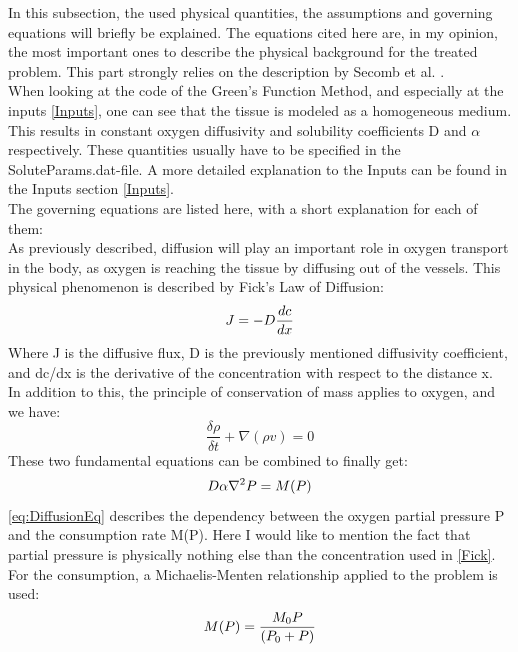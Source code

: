 In this subsection, the used physical quantities, the assumptions and governing equations will briefly be explained. The equations cited here are, in my opinion, the most important ones to describe the physical background for the treated problem. This part strongly relies on the description by Secomb et al. \cite{Secomb2004}.
\\When looking at the code of the Green's Function Method, and especially at the inputs \ref{Inputs}, one can see that the tissue is modeled as a homogeneous medium. This results in constant oxygen diffusivity and solubility coefficients D and $\alpha$ respectively. These quantities usually have to be specified in the SoluteParams.dat-file. A more detailed explanation to the Inputs can be found in the Inputs section \ref{Inputs}.
\\The governing equations are listed here, with a short explanation for each of them:
\\As previously described, diffusion will play an important role in oxygen transport in the body, as oxygen is reaching the tissue by diffusing out of the vessels. This physical phenomenon is described by Fick's Law of Diffusion:
\begin{equation}
\\J = - D \frac{dc}{dx}
\label{Fick}
\end{equation}
%
Where J is the diffusive flux, D is the previously mentioned diffusivity coefficient, and dc/dx is the derivative of the concentration with respect to the distance x.
\\In addition to this, the principle of conservation of mass applies to oxygen, and we have:
\begin{equation}
\frac{\delta \rho} {\delta t} + \nabla (\rho v) = 0
\end{equation}
%
These two fundamental equations can be combined to finally get:
\begin{equation}
\\D\alpha\nabla^2P = M(P)
\label{eq:DiffusionEq}
\end{equation}
%
\ref{eq:DiffusionEq} describes the dependency between the oxygen partial pressure P and the consumption rate M(P). Here I would like to mention the fact that partial pressure is physically nothing else than the concentration used in \ref{Fick}.
For the consumption, a Michaelis-Menten relationship applied to the problem is used:
\begin{equation}
\\M(P) = \frac{M_0P}{(P_0 + P)}
\label{eq:MichaelisMenten}
\end{equation}
